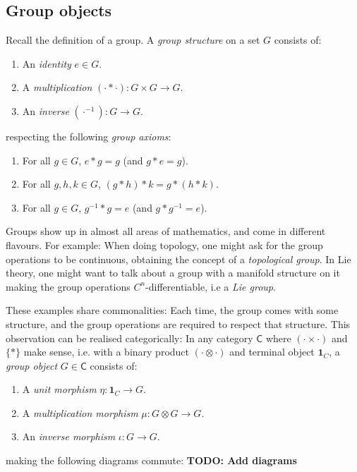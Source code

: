 \documentclass{article}
\begin{document}
\subsection{Group objects}


Recall the definition of a group. A \emph{group structure} on a set $G$ consists of:
\begin{enumerate}
  \item An \emph{identity} $e \in G$.
  \item A \emph{multiplication} $(\cdot * \cdot) : G \times G \to G$.
  \item An \emph{inverse} $(\cdot^{-1}) : G \to G$.
\end{enumerate}

respecting the following \emph{group axioms}:
\begin{enumerate}
  \item For all $g \in G$, $e * g = g$ (and $g * e = g$).
  \item For all $g, h, k \in G$, $(g * h) * k = g * (h * k)$.
  \item For all $g \in G$, $g^{-1} * g = e$ (and $g * g^{-1} = e$).
\end{enumerate}

Groups show up in almost all areas of mathematics, and come in different flavours. For example:
When doing topology, one might ask for the group operations to be continuous,
obtaining the concept of a \emph{topological group}.
In Lie theory, one might want to talk about a group with a manifold structure on it
making the group operations $C^n$-differentiable, i.e a \emph{Lie group}.

These examples share commonalities: Each time, the group comes with some structure,
and the group operations are required to respect that structure.
This observation can be realised categorically:
In any category $\mathsf C$ where $(\cdot \times \cdot)$ and $\{*\}$ make sense,
i.e. with a binary product $(\cdot \otimes \cdot)$ and terminal object $\mathbf 1_C$,
a \emph{group object} $G \in \mathsf C$ consists of:
\begin{enumerate}
  \item A \emph{unit morphism} $\eta : \mathbf 1_C \to G$.
  \item A \emph{multiplication morphism} $\mu : G \otimes G \to G$.
  \item An \emph{inverse morphism} $\iota : G \to G$.
\end{enumerate}

making the following diagrams commute:
{\bf TODO: Add diagrams}
\end{document}
